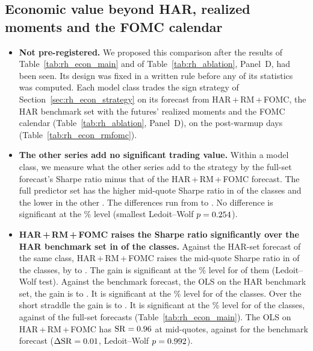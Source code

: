 \subsection{Economic value beyond HAR, realized moments and the FOMC calendar}
\label{app:rh_econ_rmfomc}
\begin{itemize}
\item \textbf{Not pre-registered.} We proposed this comparison after the results of Table~\ref{tab:rh_econ_main} and
  of Table~\ref{tab:rh_ablation}, Panel~D, had been seen. Its design was fixed in a written rule before any of its
  statistics was computed. Each model class trades the sign strategy of Section~\ref{sec:rh_econ_strategy} on its
  forecast from HAR\,+\,RM\,+\,FOMC, the HAR benchmark set with the futures' realized moments and the FOMC calendar
  (Table~\ref{tab:rh_ablation}, Panel~D), on the \rheSzDays{} post-warmup days (Table~\ref{tab:rh_econ_rmfomc}).
\item \textbf{The other series add no significant trading value.} Within a model class, we measure what the other
  \rhbyFLNSeries{} series add to the strategy by the full-set forecast's Sharpe ratio minus that of the
  HAR\,+\,RM\,+\,FOMC forecast. The full predictor
  set has the higher mid-quote Sharpe ratio in \rhemFullVsRmFomcPosWord{} of the \rhemRmFomcNClsWord{} classes and the
  lower in the other \rhemFullVsRmFomcNegWord. The differences run from \rhemFullVsRmFomcMin{} to
  \rhemFullVsRmFomcMax. No difference is significant at the \rhemSigPct\% level (smallest Ledoit--Wolf
  $p = 0.254$).
\item \textbf{HAR\,+\,RM\,+\,FOMC raises the Sharpe ratio significantly over the HAR benchmark set in
  \rhemRmFomcVsHarSigWord{} of the \rhemRmFomcNClsWord{} classes.} Against the HAR-set forecast of
  the same class, HAR\,+\,RM\,+\,FOMC raises the mid-quote Sharpe ratio in \rhemRmFomcVsHarPosWord{} of the
  \rhemRmFomcNClsWord{} classes, by \rhemRmFomcVsHarMin{} to \rhemRmFomcVsHarMax. The gain is significant at the
  \rhemSigPct\% level for \rhemRmFomcVsHarSigWord{} of them (Ledoit--Wolf test). Against the benchmark forecast, the
  OLS on the HAR benchmark set, the gain is \rhemRmFomcVsOlsMin{} to \rhemRmFomcVsOlsMax. It is significant at the
  \rhemSigPct\% level for \rhemRmFomcVsOlsSigWord{} of the \rhemRmFomcNClsWord{} classes. Over the short straddle the
  gain is \rhemRmFomcVsShortMin{} to \rhemRmFomcVsShortMax. It is significant at the \rhemSigPct\% level for
  \rhemRmFomcVsShortSigWord{} of the \rhemRmFomcNClsWord{} classes, against \rhemFullVsShortSigWord{} of the
  \rhemRmFomcNClsWord{} full-set forecasts (Table~\ref{tab:rh_econ_main}). The OLS on HAR\,+\,RM\,+\,FOMC has
  $\mathrm{SR} = 0.96$ at mid-quotes, against \rhemShOlsHar{} for the benchmark forecast
  ($\Delta\mathrm{SR} = 0.01$, Ledoit--Wolf $p = 0.992$).
\end{itemize}


